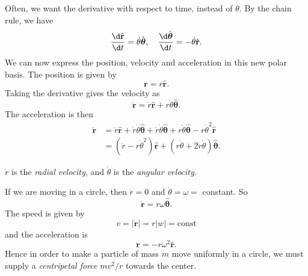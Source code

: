 \documentclass[a4paper]{article}
\begin{document}
Often, we want the derivative with respect to time, instead of $\theta$. By the chain rule, we have
\[
  \frac{\d \hat{\mathbf{r}}}{\d t} = \dot{\theta}\hat{\boldsymbol\theta},\quad \frac{\d \hat{\boldsymbol\theta}}{\d t} = -\dot{\theta} \hat{\mathbf{r}}.
\]
We can now express the position, velocity and acceleration in this new polar basis. The position is given by
\[
  \mathbf{r} = r\hat{\mathbf{r}}.
\]
Taking the derivative gives the velocity as
\[
  \dot{\mathbf{r}} = \dot{r} \hat{\mathbf{r}} + r\dot{\theta} \hat{\boldsymbol\theta}.
\]
The acceleration is then
\begin{align*}
  \ddot{\mathbf{r}} &= \ddot{r} \hat{\mathbf{r}} + \dot{r}\dot{\theta}\hat{\boldsymbol\theta} + \dot{r}\dot{\theta}\hat{\boldsymbol\theta} + r\ddot{\theta}\hat{\boldsymbol\theta} - r\dot{\theta}^2\hat{\mathbf{r}}\\
  &= (\ddot{r} - r\dot{\theta}^2)\hat{\mathbf{r}} + (r\ddot{\theta} + 2\dot{r}\dot{\theta})\hat{\boldsymbol\theta}.
\end{align*}
\begin{defi}
  $\dot{r}$ is the \emph{radial velocity}, and $\dot{\theta}$ is the \emph{angular velocity}.
\end{defi}

\begin{eg}
  If we are moving in a circle, then $\dot{r} = 0$ and $\dot{\theta} = \omega = $ constant. So
  \[
    \dot{\mathbf{r}} = r\omega\hat{\boldsymbol\theta}.
  \]
  The speed is given by
  \[
    v = |\dot{\mathbf{r}}| = r|w| = \text{const}
  \]
  and the acceleration is
  \[
    \ddot{\mathbf{r}} = -r\omega^2 \hat{\mathbf{r}}.
  \]
  Hence in order to make a particle of mass $m$ move uniformly in a circle, we must supply a \emph{centripetal force} $mv^2/r$ towards the center.
\end{eg}
\end{document}

